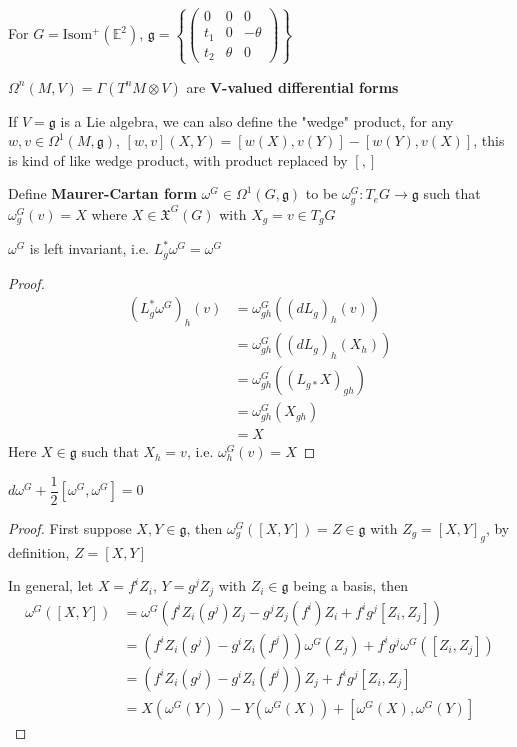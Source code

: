 \documentclass[../main.tex]{subfiles}
\begin{document}
\begin{example}
For $G=\mathrm{Isom^+}(\mathbb E^2)$, $\mathfrak g=\left\{\begin{pmatrix}
0&0&0 \\
t_1&0&-\theta \\
t_2&\theta&0
\end{pmatrix}\right\}$
\end{example}

\begin{definition}
$\Omega^n(M,V)=\Gamma(T^nM\otimes V)$ are $\mathbf{V}$\textbf{-valued differential forms} \par
If $V=\mathfrak g$ is a Lie algebra, we can also define the "wedge" product, for any $w,v\in\Omega^1(M,\mathfrak g)$, $[w,v](X,Y)=[w(X),v(Y)]-[w(Y),v(X)]$, this is kind of like wedge product, with product replaced by $[,]$
\end{definition}

\begin{definition}
Define \textbf{Maurer-Cartan form} $\omega^G\in\Omega^1(G,\mathfrak g)$ to be $\omega^G_g:T_eG\to\mathfrak g$ such that $\omega^G_g(v)=X$ where $X\in\mathfrak{X}^G(G)$ with $X_g=v\in T_gG$
\end{definition}

\begin{proposition}
$\omega^G$ is left invariant, i.e. $L_g^*\omega^G=\omega^G$
\end{proposition}

\begin{proof}
\begin{align*}
(L_g^*\omega^G)_h(v)&=\omega^G_{gh}((dL_g)_h(v)) \\
&=\omega^G_{gh}((dL_g)_h(X_h)) \\
&=\omega^G_{gh}((L_{g*}X)_{gh}) \\
&=\omega^G_{gh}(X_{gh}) \\
&=X
\end{align*}
Here $X\in\mathfrak g$ such that $X_h=v$, i.e. $\omega^G_h(v)=X$
\end{proof}

\begin{proposition}
$d\omega^G+\dfrac{1}{2}[\omega^G,\omega^G]=0$
\end{proposition}

\begin{proof}
First suppose $X,Y\in\mathfrak g$, then $\omega^G_g([X,Y])=Z\in\mathfrak g$ with $Z_g=[X,Y]_g$, by definition, $Z=[X,Y]$ \par
In general, let $X=f^iZ_i$, $Y=g^jZ_j$ with $Z_i\in\mathfrak g$ being a basis, then
\begin{align*}
\omega^G([X,Y])&=\omega^G(f^iZ_i(g^j)Z_j-g^jZ_j(f^i)Z_i+f^ig^j[Z_i,Z_j]) \\
&=(f^iZ_i(g^j)-g^iZ_i(f^j))\omega^G(Z_j)+f^ig^j\omega^G([Z_i,Z_j]) \\
&=(f^iZ_i(g^j)-g^iZ_i(f^j))Z_j+f^ig^j[Z_i,Z_j] \\
&=X(\omega^G(Y))-Y(\omega^G(X))+[\omega^G(X),\omega^G(Y)]
\end{align*}
\end{proof}
\end{document}
